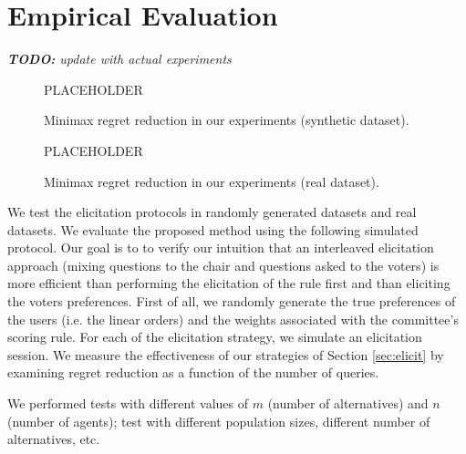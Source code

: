 
\section{Empirical Evaluation} \label{sec:experiments}

{\em {\bf TODO:} update with actual experiments}

\begin{figure}[t]
\begin{center}PLACEHOLDER\end{center}
\vspace{3.5cm}
\caption{Minimax regret reduction in our experiments (synthetic dataset).}
\end{figure}

\begin{figure}[t]
\begin{center}PLACEHOLDER\end{center}
\vspace{3.5cm}
\caption{Minimax regret reduction in our experiments (real dataset).}
\end{figure}

We test the elicitation protocols in randomly generated datasets and real datasets. %
We evaluate the proposed method using the following simulated protocol.
Our goal is to 
 to verify our intuition that an interleaved elicitation approach (mixing questions to the chair and questions asked to the voters) is more efficient than performing the elicitation of the rule first and than eliciting the voters preferences.
First of all, we randomly generate the true preferences of the users (i.e. the linear orders) and the weights associated with the committee's scoring rule.
For each of the elicitation strategy, we simulate an elicitation session.
We measure the effectiveness of our strategies of Section \ref{sec:elicit} by examining regret reduction as a function of the number of queries.

We performed tests with different values of $m$ (number of alternatives) and $n$ (number of agents); test with different population sizes, different number of alternatives, etc.

